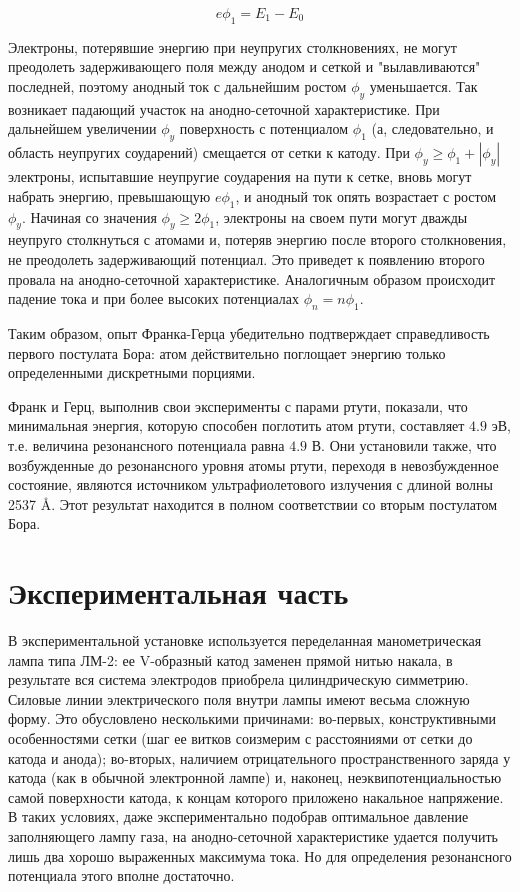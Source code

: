 \begin{equation*}
	e \phi_1=E_1-E_0
\end{equation*}

Электроны, потерявшие энергию при неупругих столкновениях, не могут преодолеть задерживающего поля между анодом и сеткой и "вылавливаются" последней, поэтому анодный ток с дальнейшим ростом $\phi_y$ уменьшается. Так возникает падающий участок на анодно-сеточной характеристике.
При дальнейшем увеличении $\phi_y$ поверхность с потенциалом $\phi_1$ (а, следовательно, и область неупругих соударений) смещается от сетки к катоду. При $\phi_y \geq \phi_1+|\phi_y|$ электроны, испытавшие неупругие соударения на пути к сетке, вновь могут набрать энергию, превышающую $e\phi_1$, и анодный ток опять возрастает с ростом $\phi_y$. Начиная со значения $\phi_y \geq 2\phi_1$, электроны на своем пути могут дважды неупруго столкнуться с атомами и, потеряв энергию после второго столкновения, не преодолеть задерживающий потенциал. Это приведет к появлению второго провала на анодно-сеточной характеристике. Аналогичным образом происходит падение тока и при более высоких потенциалах $\phi_n=n\phi_1$.

Таким образом, опыт Франка-Герца убедительно подтверждает справедливость первого постулата Бора: атом действительно поглощает энергию только определенными дискретными порциями.

Франк и Герц, выполнив свои эксперименты с парами ртути, показали, что минимальная энергия, которую способен поглотить атом ртути, составляет $4.9$ эВ, т.е. величина резонансного потенциала равна $4.9$ В. Они установили также, что возбужденные до резонансного уровня атомы ртути, переходя в невозбужденное состояние, являются источником ультрафиолетового излучения с длиной волны 2537 \AA. Этот результат находится в полном соответствии со вторым постулатом Бора.

\section{Экспериментальная часть}

В экспериментальной установке используется переделанная манометрическая лампа типа ЛМ-2: ее V-образный катод заменен прямой нитью накала, в результате вся система электродов приобрела цилиндрическую симметрию. Силовые линии электрического поля внутри лампы имеют весьма сложную форму. Это обусловлено несколькими причинами: во-первых, конструктивными особенностями сетки (шаг ее витков соизмерим с расстояниями от сетки до катода и анода); во-вторых, наличием отрицательного пространственного заряда у катода (как в обычной электронной лампе) и, наконец, неэквипотенциальностью самой поверхности катода, к концам которого приложено накальное напряжение. В таких условиях, даже экспериментально подобрав оптимальное давление заполняющего лампу газа, на анодно-сеточной характеристике удается получить лишь два хорошо выраженных максимума тока. Но для определения резонансного потенциала этого вполне достаточно.

